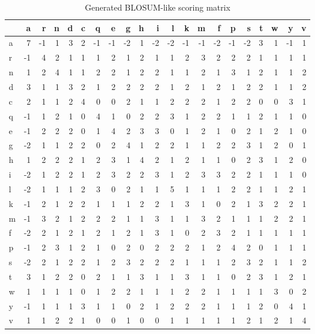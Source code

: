 \documentclass[a4paper,11pt]{article}
\begin{document}
\begin{table}[!hbp]
	\centering
	\begin{tabular}{l|*{20}{r} }
		& a  & r  & n & d & c & q  & e  & g  & h & i  & l  & k  & m  & f  & p  & s  & t & w & y  & v \\ \hline
		a & 7  & -1 & 1 & 3 & 2 & -1 & -1 & -2 & 1 & -2 & -2 & -1 & -1 & -2 & -1 & -2 & 3 & 1 & -1 & 1 \\
		r & -1 & 4  & 2 & 1 & 1 & 1  & 2  & 1  & 2 & 1  & 1  & 2  & 3  & 2  & 2  & 2  & 1 & 1 & 1  & 1 \\
		n & 1  & 2  & 4 & 1 & 1 & 2  & 2  & 1  & 2 & 2  & 1  & 1  & 2  & 1  & 3  & 1  & 2 & 1 & 1  & 2 \\
		d & 3  & 1  & 1 & 3 & 2 & 1  & 2  & 2  & 2 & 2  & 1  & 2  & 1  & 2  & 1  & 2  & 2 & 1 & 1  & 2 \\
		c & 2  & 1  & 1 & 2 & 4 & 0  & 0  & 2  & 1 & 1  & 2  & 2  & 2  & 1  & 2  & 2  & 0 & 0 & 3  & 1 \\
		q & -1 & 1  & 2 & 1 & 0 & 4  & 1  & 0  & 2 & 2  & 3  & 1  & 2  & 2  & 1  & 1  & 2 & 1 & 1  & 0 \\
		e & -1 & 2  & 2 & 2 & 0 & 1  & 4  & 2  & 3 & 3  & 0  & 1  & 2  & 1  & 0  & 2  & 1 & 2 & 1  & 0 \\
		g & -2 & 1  & 1 & 2 & 2 & 0  & 2  & 4  & 1 & 2  & 2  & 1  & 1  & 2  & 2  & 3  & 1 & 2 & 0  & 1 \\
		h & 1  & 2  & 2 & 2 & 1 & 2  & 3  & 1  & 4 & 2  & 1  & 2  & 1  & 1  & 0  & 2  & 3 & 1 & 2  & 0 \\
		i & -2 & 1  & 2 & 2 & 1 & 2  & 3  & 2  & 2 & 3  & 1  & 2  & 3  & 3  & 2  & 2  & 1 & 1 & 1  & 0 \\
		l & -2 & 1  & 1 & 1 & 2 & 3  & 0  & 2  & 1 & 1  & 5  & 1  & 1  & 1  & 2  & 2  & 1 & 1 & 2  & 1 \\
		k & -1 & 2  & 1 & 2 & 2 & 1  & 1  & 1  & 2 & 2  & 1  & 3  & 1  & 0  & 2  & 1  & 3 & 2 & 2  & 1 \\
		m & -1 & 3  & 2 & 1 & 2 & 2  & 2  & 1  & 1 & 3  & 1  & 1  & 3  & 2  & 1  & 1  & 1 & 2 & 2  & 1 \\
		f & -2 & 2  & 1 & 2 & 1 & 2  & 1  & 2  & 1 & 3  & 1  & 0  & 2  & 3  & 2  & 1  & 1 & 1 & 1  & 1 \\
		p & -1 & 2  & 3 & 1 & 2 & 1  & 0  & 2  & 0 & 2  & 2  & 2  & 1  & 2  & 4  & 2  & 0 & 1 & 1  & 1 \\
		s & -2 & 2  & 1 & 2 & 2 & 1  & 2  & 3  & 2 & 2  & 2  & 1  & 1  & 1  & 2  & 3  & 2 & 1 & 1  & 2 \\
		t & 3  & 1  & 2 & 2 & 0 & 2  & 1  & 1  & 3 & 1  & 1  & 3  & 1  & 1  & 0  & 2  & 3 & 1 & 2  & 1 \\
		w & 1  & 1  & 1 & 1 & 0 & 1  & 2  & 2  & 1 & 1  & 1  & 2  & 2  & 1  & 1  & 1  & 1 & 3 & 0  & 2 \\
		y & -1 & 1  & 1 & 1 & 3 & 1  & 1  & 0  & 2 & 1  & 2  & 2  & 2  & 1  & 1  & 1  & 2 & 0 & 4  & 1 \\
		v & 1  & 1  & 2 & 2 & 1 & 0  & 0  & 1  & 0 & 0  & 1  & 1  & 1  & 1  & 1  & 2  & 1 & 2 & 1  & 4\\
		\hline
	\end{tabular}
	\caption{Generated BLOSUM-like scoring matrix}
    \label{substitutions}
\end{table}
\end{document}
